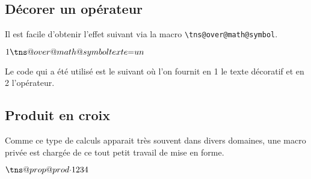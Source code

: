 \documentclass[12pt,a4paper]{article}
\newcommand\env[1]{\texttt{#1}}
\newcommand\macro[1]{\env{\textbackslash{}#1}}
\theoremstyle{definition}
\begin{document}
{{{{{{{{{{{\begin{latexex-alone}
\newcommand\myinter[2]{%
    \tns@generic@interval@semi@ext{\{}%
                                  {#1}{::}{#2}%
                                  {)}%
}
\end{latexex-alone}



\subsection{Décorer un opérateur}

Il est facile d'obtenir l'effet suivant via la macro \macro{tns@over@math@symbol}.

\makeatletter
\newcommand\eqtxt{\tns@over@math@symbol{texte}{=}}
\makeatother

\begin{latexex}
$1 \eqtxt un$
\end{latexex}


Le code qui a été utilisé est le suivant où l'on fournit en 1\ier{} le texte décoratif et en 2\ieme{} l'opérateur.


\begin{latexex-alone}
\newcommand\eqtxt{\tns@over@math@symbol{texte}{=}}
\end{latexex-alone}



\subsection{Produit en croix}

Comme ce type de calculs apparait très souvent dans divers domaines, une macro privée est chargée de ce tout petit travail de mise en forme.

\begin{latexex}
\makeatletter
$\tns@prop@prod{\cdot} %
               {1}{2}  %
               {3}{4}$ %
\makeatother
\end{latexex}



}}}}}}}}}}}
\end{document}
